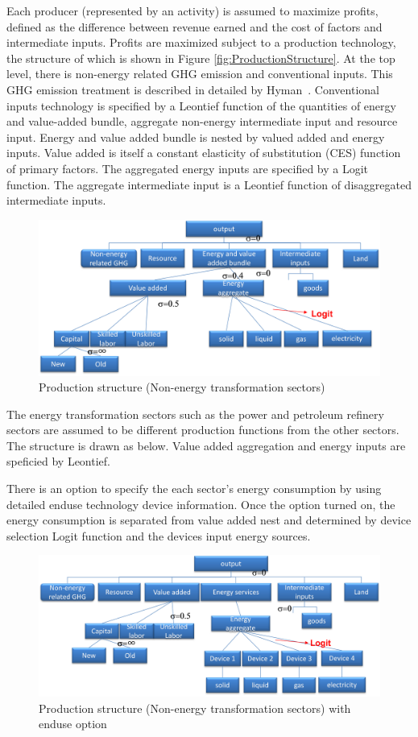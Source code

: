 \documentclass[10pt,a4paper,titlepage,dvipdfmx]{book}
\begin{document}
Each producer (represented by an activity) is assumed to maximize profits, defined as the difference between revenue earned and the cost of factors and intermediate inputs. Profits are maximized subject to a production technology, the structure of which is shown in Figure \ref{fig:ProductionStructure}. At the top level, there is non-energy related GHG emission and conventional inputs. This GHG emission treatment is described in detailed by Hyman~\cite{RN2134}. Conventional inputs technology is specified by a Leontief function of the quantities of energy and value-added bundle, aggregate non-energy intermediate input and resource input. Energy and value added bundle is nested by valued added and energy inputs. Value added is itself a constant elasticity of substitution (CES) function of primary factors. The aggregated energy inputs are specified by a Logit function. The aggregate intermediate input is a Leontief function of disaggregated intermediate inputs. 
\begin{figure}
\includegraphics[width=1\textwidth]{fig/image3.png}
\caption{\label{fig:ProductionStructure} Production structure (Non-energy transformation sectors)}   
\label{fig:2}
\end{figure}
The energy transformation sectors such as the power and petroleum refinery sectors are assumed to be different production functions from the other sectors. The structure is drawn as below. Value added aggregation and energy inputs are speficied by Leontief.

There is an option to specify the each sector's energy consumption by using detailed enduse technology device information. Once the option turned on, the energy consumption is separated from value added nest and determined by device selection Logit function and the devices input energy sources.
\begin{figure}
\includegraphics[width=1\textwidth]{fig/image4.png}
\caption{\label{fig:Production structure2}Production structure (Non-energy transformation sectors) with enduse option}
\end{figure}
\end{document}
